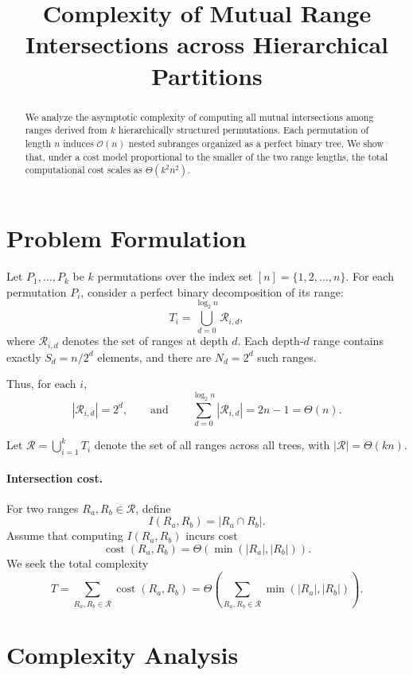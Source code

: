 \documentclass[11pt]{article}
\title{Complexity of Mutual Range Intersections across Hierarchical Partitions}
\author{}
\date{}
\begin{document}
\maketitle

\begin{abstract}
We analyze the asymptotic complexity of computing all mutual intersections among ranges derived from $k$ hierarchically structured permutations. Each permutation of length $n$ induces $\mathcal{O}(n)$ nested subranges organized as a perfect binary tree. We show that, under a cost model proportional to the smaller of the two range lengths, the total computational cost scales as $\Theta(k^2 n^2)$.
\end{abstract}

\section{Problem Formulation}

Let $P_1, \dots, P_k$ be $k$ permutations over the index set $[n] = \{1, 2, \dots, n\}$.  
For each permutation $P_i$, consider a perfect binary decomposition of its range:
\[
T_i = \bigcup_{d=0}^{\log_2 n} \mathcal{R}_{i,d},
\]
where $\mathcal{R}_{i,d}$ denotes the set of ranges at depth $d$.  
Each depth-$d$ range contains exactly $S_d = n / 2^d$ elements, and there are $N_d = 2^d$ such ranges.

Thus, for each $i$,
\[
|\mathcal{R}_{i,d}| = 2^d, \qquad \text{and} \qquad \sum_{d=0}^{\log_2 n} |\mathcal{R}_{i,d}| = 2n - 1 = \Theta(n).
\]

Let $\mathcal{R} = \bigcup_{i=1}^k T_i$ denote the set of all ranges across all trees, with $|\mathcal{R}| = \Theta(kn)$.

\paragraph{Intersection cost.}  
For two ranges $R_a, R_b \in \mathcal{R}$, define
\[
I(R_a, R_b) = |R_a \cap R_b|.
\]
Assume that computing $I(R_a, R_b)$ incurs cost
\[
\operatorname{cost}(R_a, R_b) = \Theta(\min(|R_a|, |R_b|)).
\]
We seek the total complexity
\[
T = \sum_{R_a, R_b \in \mathcal{R}} \operatorname{cost}(R_a, R_b)
  = \Theta\!\left( \sum_{R_a, R_b \in \mathcal{R}} \min(|R_a|, |R_b|) \right).
\]

\section{Complexity Analysis}
\end{document}
